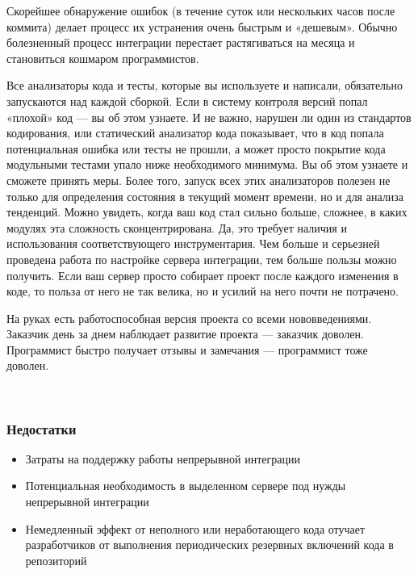 \documentclass{../industrial-development}
\begin{document}
\lecturenotes
Скорейшее обнаружение ошибок (в течение суток или нескольких часов после коммита) делает процесс их устранения очень быстрым и «дешевым». Обычно болезненный процесс интеграции перестает растягиваться на месяца и становиться кошмаром программистов.

Все анализаторы кода и тесты, которые вы используете и написали, обязательно запускаются над каждой сборкой. Если в систему контроля версий попал «плохой» код — вы об этом узнаете. И не важно, нарушен ли один из стандартов кодирования, или статический анализатор кода показывает, что в код попала потенциальная ошибка или тесты не прошли, а может просто покрытие кода модульными тестами упало ниже необходимого минимума. Вы об этом узнаете и сможете принять меры.
Более того, запуск всех этих анализаторов полезен не только для определения состояния в текущий момент времени, но и для анализа тенденций. Можно увидеть, когда ваш код стал сильно больше, сложнее, в каких модулях эта сложность сконцентрирована. Да, это требует наличия и использования соответствующего инструментария.
Чем больше и серьезней проведена работа по настройке сервера интеграции, тем больше пользы можно получить. Если ваш сервер просто собирает проект после каждого изменения в коде, то польза от него не так велика, но и усилий на него почти не потрачено.

На руках есть работоспособная версия проекта со всеми нововведениями. Заказчик день за днем наблюдает развитие проекта — заказчик доволен. Программист быстро получает отзывы и замечания — программист тоже доволен.

~\cite{Wiki_Continuous_integration}
~\cite{Custis_Continuous Integration}

\begin{frame} \frametitle{Недостатки}
	\begin{block}{}
		\begin{itemize}
			\item Затраты на поддержку работы непрерывной интеграции
			\item Потенциальная необходимость в выделенном сервере под нужды
			непрерывной интеграции
			\item Немедленный эффект от неполного или неработающего кода отучает
			разработчиков от выполнения периодических резервных включений кода в
			репозиторий
		\end{itemize}
	\end{block}
\end{frame}
\end{document}
